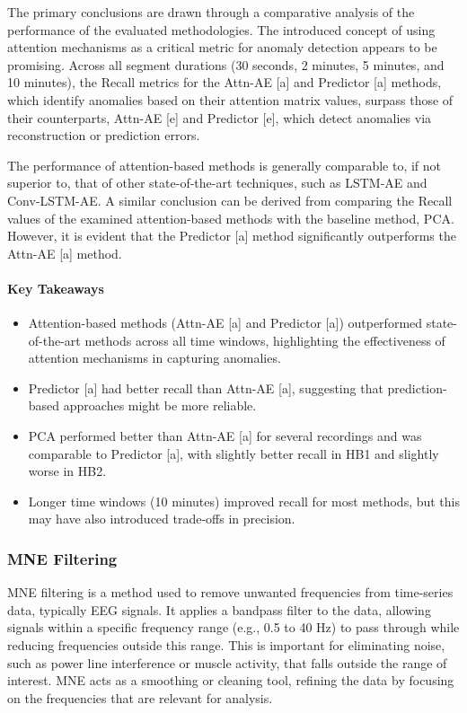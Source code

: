 The primary conclusions are drawn through a comparative analysis of the performance of the evaluated methodologies. The introduced concept of using attention mechanisms as a critical metric for anomaly detection appears to be promising. Across all segment durations (30 seconds, 2 minutes, 5 minutes, and 10 minutes), the Recall metrics for the Attn-AE [a] and Predictor [a] methods, which identify anomalies based on their attention matrix values, surpass those of their counterparts, Attn-AE [e] and Predictor [e], which detect anomalies via reconstruction or prediction errors.

The performance of attention-based methods is generally comparable to, if not superior to, that of other state-of-the-art techniques, such as LSTM-AE and Conv-LSTM-AE. A similar conclusion can be derived from comparing the Recall values of the examined attention-based methods with the baseline method, PCA. However, it is evident that the Predictor [a] method significantly outperforms the Attn-AE [a] method.

\vspace{0.5cm}
\paragraph{Key Takeaways}

\begin{itemize}
    \item Attention-based methods (Attn-AE [a] and Predictor [a]) outperformed state-of-the-art methods across all time windows, highlighting the effectiveness of attention mechanisms in capturing anomalies.
    \item Predictor [a] had better recall than Attn-AE [a], suggesting that prediction-based approaches might be more reliable.
    \item PCA performed better than Attn-AE [a] for several recordings and was comparable to Predictor [a], with slightly better recall in HB1 and slightly worse in HB2.
    \item Longer time windows (10 minutes) improved recall for most methods, but this may have also introduced trade-offs in precision.
\end{itemize}


\subsubsection{MNE Filtering}

MNE filtering is a method used to remove unwanted frequencies from time-series data, typically EEG signals. It applies a bandpass filter to the data, allowing signals within a specific frequency range (e.g., 0.5 to 40 Hz) to pass through while reducing frequencies outside this range. This is important for eliminating noise, such as power line interference or muscle activity, that falls outside the range of interest. MNE acts as a smoothing or cleaning tool, refining the data by focusing on the frequencies that are relevant for analysis.

